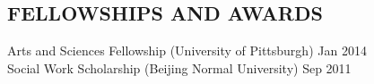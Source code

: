 \begin{resume}
%


%
%



\section{\textsc{FELLOWSHIPS AND AWARDS}}
Arts and Sciences Fellowship (University of Pittsburgh) \hfill Jan 2014\\
Social Work Scholarship (Beijing Normal University)  \hfill Sep 2011






\end{resume}

